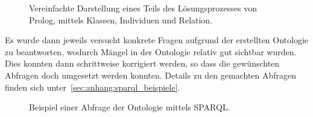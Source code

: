 \begin{figure}[H]
\centering {}
\caption{Vereinfachte Darstellung eines Teils des Lösungsprozesses von Prolog, mittels Klassen, Individuen und Relation.\label{fig:prolog_loesungsprozess}\protect\footnotemark}
\end{figure}

Es wurde dann jeweils versucht konkrete Fragen aufgrund der erstellten Ontologie zu beantworten, wodurch Mängel in der Ontologie relativ gut sichtbar wurden. Dies konnten dann schrittweise korrigiert werden, so dass die gewünschten Abfragen doch umgesetzt werden konnten. Details zu den gemachten Abfragen finden sich unter~\autoref{sec:anhang:sparql_beispiele}.

\begin{figure}[H]
\centering {}
\caption{Beispiel einer Abfrage der Ontologie mittels SPARQL.\label{fig:sparql_beispiel}\protect\footnotemark}
\end{figure}

